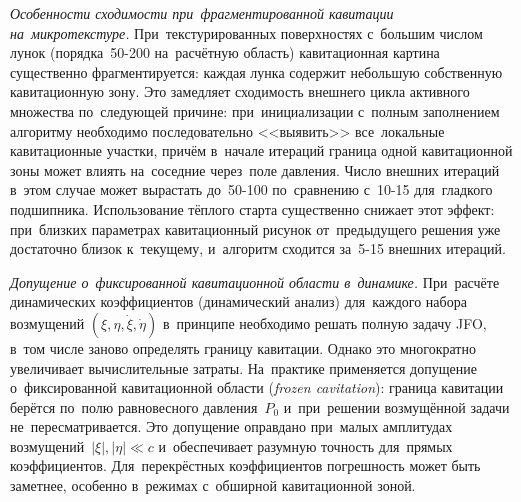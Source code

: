 \textit{Особенности сходимости при~фрагментированной кавитации на~микротекстуре.}
При~текстурированных поверхностях с~большим числом лунок (порядка~50-200 на~расчётную область) кавитационная картина существенно фрагментируется: каждая лунка содержит небольшую собственную кавитационную зону. Это замедляет сходимость внешнего цикла активного множества по~следующей причине: при~инициализации с~полным заполнением алгоритму необходимо последовательно <<выявить>> все~локальные кавитационные участки, причём в~начале итераций граница одной кавитационной зоны может влиять на~соседние через~поле давления. Число внешних итераций в~этом случае может вырастать до~50-100 по~сравнению с~10-15 для~гладкого подшипника. Использование тёплого старта существенно снижает этот эффект: при~близких параметрах кавитационный рисунок от~предыдущего решения уже достаточно близок к~текущему, и~алгоритм сходится за~5-15 внешних итераций.

\textit{Допущение о~фиксированной кавитационной области в~динамике.}
При~расчёте динамических коэффициентов (динамический анализ) для~каждого набора возмущений $(\xi, \eta, \dot\xi, \dot\eta)$ в~принципе необходимо решать полную задачу JFO, в~том числе заново определять границу кавитации. Однако это многократно увеличивает вычислительные затраты. На~практике применяется допущение о~фиксированной кавитационной области (\textit{frozen cavitation}): граница кавитации берётся по~полю равновесного давления~$P_0$ и~при~решении возмущённой задачи не~пересматривается. Это допущение оправдано при~малых амплитудах возмущений~$|\xi|, |\eta| \ll c$ и~обеспечивает разумную точность для~прямых коэффициентов. Для~перекрёстных коэффициентов погрешность может быть заметнее, особенно в~режимах с~обширной кавитационной зоной.
